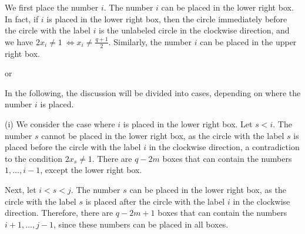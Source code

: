 \documentclass{article}
\theoremstyle{plain}
\theoremstyle{definition}
\theoremstyle{remark}
\numberwithin{equation}{section}
\begin{document}
We first place the number $i$.
The number $i$ can be placed in the lower right box.
In fact, if $i$ is placed in the lower right box, then the circle immediately before the circle with the label $i$ is the unlabeled circle in the clockwise direction, and we have $\displaystyle 2x_i\neq 1\ \Leftrightarrow x_i\neq \frac{q+1}{2}$.
Similarly, the number $i$ can be placed in the upper right box.
\begin{center}
\quad or\quad
{}
\end{center}
In the following, the discussion will be divided into cases, depending on where the number $i$ is placed.

(i) We consider the case where $i$ is placed in the lower right box.
Let $s<i$.
The number $s$ cannot be placed in the lower right box, as the circle with the label $s$ is placed before the circle with the label $i$ in the clockwise direction, a contradiction to the condition $2x_s\neq 1$.
There are $q-2m$ boxes that can contain the numbers $1,\dots,i-1$, except the lower right box.
\begin{center}
\end{center}
Next, let $i<s<j$.
The number $s$ can be placed in the lower right box, as the circle with the label $s$ is placed after the circle with the label $i$ in the clockwise direction.
Therefore, there are $q-2m+1$ boxes that can contain the numbers $i+1,\dots,j-1$, since these numbers can be placed in all boxes.
\end{document}
